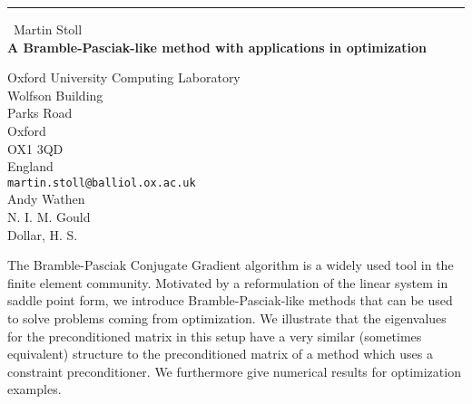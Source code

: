 \documentclass{report}
\begin{document}
\begin{center}
\rule{6in}{1pt} \
{\large Martin Stoll \\
{\bf A Bramble-Pasciak-like method with applications in optimization}}

Oxford University Computing Laboratory \\ Wolfson Building \\ Parks Road \\ Oxford \\ OX1 3QD \\ England
\\
{\tt martin.stoll@balliol.ox.ac.uk}\\
Andy Wathen\\
N. I. M. Gould \\
	Dollar, H. S.\end{center}

The Bramble-Pasciak Conjugate Gradient algorithm is a widely used tool in
the finite element community. Motivated by a reformulation of the linear
system in saddle point form, we introduce Bramble-Pasciak-like methods
that can be used to solve problems coming from optimization. We
illustrate that the eigenvalues for the preconditioned matrix in this
setup have a very similar (sometimes equivalent) structure to the
preconditioned matrix of a method which uses a constraint preconditioner.
We furthermore give numerical results for optimization examples.
\end{document}
